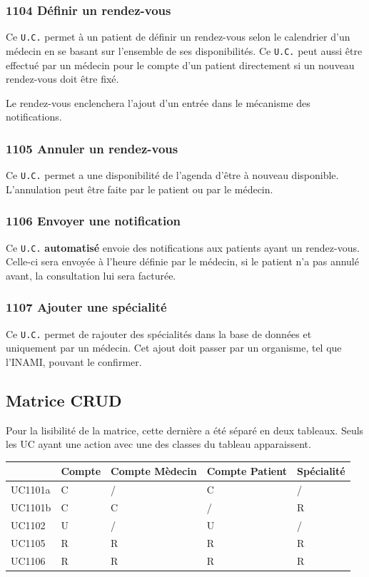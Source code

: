 \documentclass[a4paper, 11pt]{report}
\begin{document}
\subsubsection{\label{1104}1104 Définir un rendez-vous}
Ce \texttt{U.C.} permet à un patient de définir un rendez-vous selon le
calendrier d'un médecin en se basant sur l'ensemble de ses disponibilités. 
Ce \texttt{U.C.} peut aussi être effectué par un médecin pour le compte d'un
patient directement si un nouveau rendez-vous doit être fixé.

Le rendez-vous enclenchera l'ajout d'un entrée dans le mécanisme des
notifications.
\subsubsection{\label{1105}1105 Annuler un rendez-vous}
Ce \texttt{U.C.} permet a une disponibilité de l'agenda d'être à nouveau
disponible. L'annulation peut être faite par le patient ou par le médecin. 
\subsubsection{\label{1106}1106 Envoyer une notification}
Ce \texttt{U.C.} \textbf{automatisé} envoie des notifications aux patients ayant
un rendez-vous. Celle-ci sera envoyée à l'heure définie par le médecin, si le
patient n'a pas annulé avant, la consultation lui sera facturée.
\subsubsection{\label{1107}1107 Ajouter une spécialité}
Ce \texttt{U.C.} permet de rajouter des spécialités dans la base de données et
uniquement par un médecin. Cet ajout doit passer par un organisme, tel que
l'INAMI, pouvant le confirmer.
\newpage
\subsection{Matrice CRUD}

Pour la lisibilité de la matrice, cette dernière a été séparé en deux tableaux.
Seuls les UC ayant une action avec une des classes du tableau apparaissent.

\begin{center}
	\begin{longtable}{|p{1.5cm}|p{1.5cm}|p{1.5cm}|p{1.5cm}|p{1.5cm}|}
		\hline
		& Compte & Compte Mèdecin & Compte Patient & Spécialité \\
		\hline
		UC1101a & C & / & C & / \\
		\hline
		UC1101b & C & C & / & R \\
		\hline
		UC1102  & U & / & U & / \\
		\hline
		UC1105  & R & R & R & R \\
		\hline
		UC1106 & R & R & R & R \\
		\hline

	\end{longtable}
\end{center}
\end{document}
